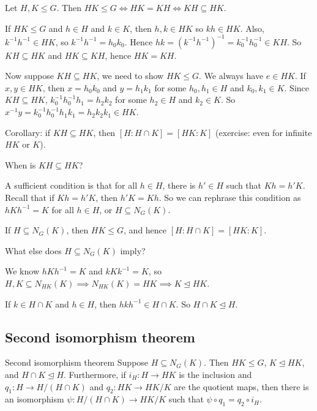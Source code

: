 \documentclass[12pt,letterpaper]{report}
\begin{document}
\begin{prop}{}{}
  Let $H, K \leq G$.
  Then $HK \leq G \iff HK = KH \iff KH \subseteq HK$.
\end{prop}

\begin{thmproof}
  If $HK \leq G$ and $h \in H$ and $k \in K$, then $h, k \in HK$ so $kh \in HK$.
  Also, $k^{-1}h^{-1} \in HK$, so $k^{-1}h^{-1} = h_0k_0$.
  Hence $hk = (k^{-1}h^{-1})^{-1} = k_0^{-1}h_0^{-1} \in KH$.
  So $KH \subseteq HK$ and $HK \subseteq KH$, hence $HK = KH$.

  Now suppose $KH \subseteq HK$, we need to show $HK \leq G$.
  We always have $e \in HK$.
  If $x, y \in HK$, then $x = h_0k_0$ and $y = h_1k_1$ for some $h_0, h_1 \in H$ and
  $k_0, k_1 \in K$.
  Since $KH \subseteq HK$, $k_0^{-1}h_0^{-1}h_1 = h_2k_2$ for some $h_2 \in H$ and $k_2 \in K$.
  So $x^{-1}y = k_0^{-1}h_0^{-1}h_1k_1 = h_2k_2k_1 \in HK$.
\end{thmproof}

Corollary: if $KH \subseteq HK$, then $[H : H \cap K] = [HK : K]$ (exercise: even for infinite
$HK$ or $K$).

When is $KH \subseteq HK$?

A sufficient condition is that for all $h \in H$, there is $h' \in H$ such that $Kh = h'K$.
Recall that if $Kh = h'K$, then $h'K = Kh$.
So we can rephrase this condition as $hKh^{-1} = K$ for all $h \in H$, or $H \subseteq N_G(K)$.

\begin{cor}{}{}
  If $H \subseteq N_G(K)$, then $HK \leq G$, and hence $[H : H \cap K] = [HK : K]$.
\end{cor}

What else does $H \subseteq N_G(K)$ imply?

We know $hKh^{-1} = K$ and $kKk^{-1} = K$, so
$H, K \subseteq N_{HK}(K) \implies N_{HK}(K) = HK \implies K \trianglelefteq HK$.

If $k \in H \cap K$ and $h \in H$, then $hkh^{-1} \in H \cap K$.
So $H \cap K \trianglelefteq H$.

\pagebreak
\subsection{Second isomorphism theorem}

\begin{thm}{Second isomorphism theorem}{}
  Suppose $H \subseteq N_G(K)$.
  Then $HK \leq G$, $K \trianglelefteq HK$, and $H \cap K \trianglelefteq H$.
  Furthermore, if $i_H \colon H \to HK$ is the inclusion and $q_1 \colon H \to H/(H \cap K)$ and
  $q_2 \colon HK \to HK/K$ are the quotient maps, then there is an isomorphism
  $\psi \colon H/(H \cap K) \to HK/K$ such that $\psi \circ q_1 = q_2 \circ i_H$.
\end{thm}
\end{document}

